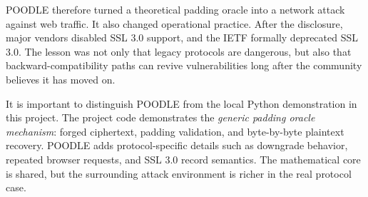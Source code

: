 POODLE therefore turned a theoretical padding oracle into a network attack against web traffic. It also changed operational practice. After the disclosure, major vendors disabled SSL 3.0 support, and the IETF formally deprecated SSL 3.0. The lesson was not only that legacy protocols are dangerous, but also that backward-compatibility paths can revive vulnerabilities long after the community believes it has moved on.

It is important to distinguish POODLE from the local Python demonstration in this project. The project code demonstrates the \emph{generic padding oracle mechanism}: forged ciphertext, padding validation, and byte-by-byte plaintext recovery. POODLE adds protocol-specific details such as downgrade behavior, repeated browser requests, and SSL 3.0 record semantics. The mathematical core is shared, but the surrounding attack environment is richer in the real protocol case.

